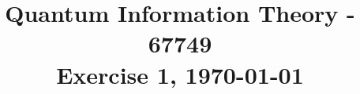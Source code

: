 \usepackage[utf8x]{inputenc}





\usepackage[pdftex]{graphicx} %

\usepackage[pdftex,linkcolor=black,pdfborder={0 0 0}]{hyperref} %


\usepackage[a4paper, lmargin=0.1666\paperwidth, rmargin=0.1666\paperwidth, tmargin=0.1111\paperheight, bmargin=0.1111\paperheight]{geometry} %

\usepackage[protrusion=true,expansion=true]{microtype} %

\usepackage{lipsum} %
\usepackage{amsmath}
\usepackage{amsfonts}
\usepackage{braket}
\usepackage{subcaption}

\usepackage{tikz}

\usetikzlibrary{quantikz2}

\usepackage[
backend=biber,
style=alphabetic,
sorting=ynt
]{biblatex}


\usepackage{lmodern}
\usepackage{framed}
\usepackage{advdate}




\title{ \begin{framed} Quantum Information Theory - 67749 \\ 
Exercise 1, \today \end{framed}  }
\date{\vspace{-5ex}}


\maketitle{ }    


\newcommand{\CCZ}{\textbf{CCZ}}
\newcommand{\CCX}{\textbf{CCX}}


\setcounter{enumcirc}{1} 


\newcommand{\advanceday}[1][11]{%
\begingroup
\AdvanceDate[#1]%
\today%
\endgroup
}%


\newcommand{\subqCircEx}[2]{\begin{subfigure}[t]{0.5\textwidth}
        \stepcounter{enumcirc} \caption*{ (\alph{enumcirc}) #1} \centering 
        #2
    \end{subfigure}
}

